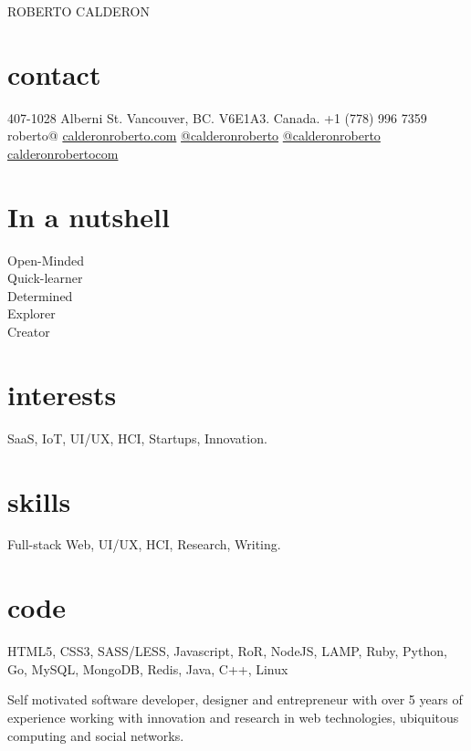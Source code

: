 \documentclass[full]{rvca}
\begin{document}


\begin{aside} %
{\large ROBERTO CALDERON}
\section{contact}
407-1028 Alberni St.
Vancouver, BC.
V6E1A3. Canada.
+1 (778) 996 7359
\ghost
roberto@
\href{http://calderonroberto.com}{calderonroberto.com}
\TwitterIcon  \href{http://twitter.com/calderonroberto}{@calderonroberto} 
\GithubIcon \href{https://github.com/calderonroberto}{@calderonroberto} 
\LinkedinIcon \href{https://ca.linkedin.com/in/calderonrobertocom}{calderonrobertocom} 
\section{In a nutshell}
Open-Minded\\Quick-learner\\Determined\\Explorer\\Creator 
% 
\section{interests}
SaaS, IoT, UI/UX, HCI, Startups, Innovation.
%
\section{skills}
Full-stack Web, UI/UX, 
HCI, Research, Writing.
% 
\section{code}
HTML5, CSS3, SASS/LESS, \HeartIcon Javascript, 
\HeartIcon RoR, \HeartIcon NodeJS, LAMP,
\HeartIcon Ruby, Python, \HeartIcon Go,
MySQL, MongoDB, Redis,
Java, C++, \HeartIcon Linux
\end{aside}


\begin{statement}
Self motivated software developer, designer and entrepreneur with over 5 years of experience working with innovation and research in web technologies, ubiquitous computing and social networks.
\end{statement}
\end{document}
